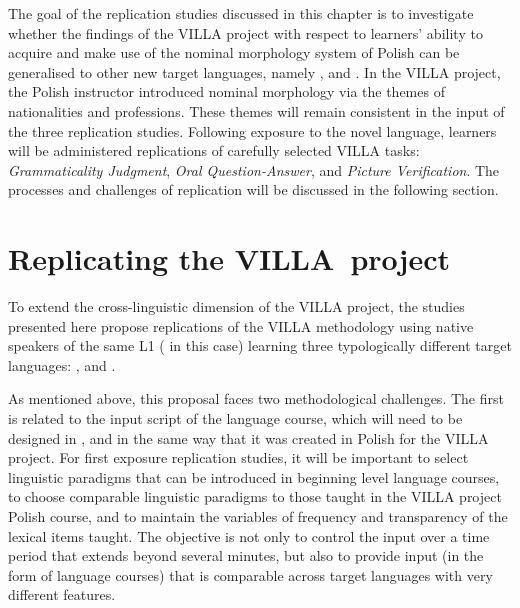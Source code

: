 \documentclass[output=paper,colorlinks,citecolor=brown,modfonts,nonflat]{../langscibook}
\begin{document}
The goal of the replication studies discussed in this chapter is to investigate whether the findings of the VILLA project with respect to learners’ ability to acquire and make use of the nominal morphology system of Polish can be generalised to other new target languages, namely ,  and . In the VILLA project, the Polish instructor introduced nominal morphology via the themes of nationalities and professions. These themes will remain consistent in the input of the three replication studies. Following exposure to the novel language, learners will be administered replications of carefully selected VILLA tasks: \textit{Grammaticality Judgment}, \textit{Oral Question-Answer}, and \textit{Picture Verification}. The processes and challenges of replication will be discussed in the following section.

\section{Replicating the VILLA~project}\label{sec:watorek:4}

To extend the cross-linguistic dimension of the VILLA project, the studies presented here propose replications of the VILLA methodology using native speakers of the same L1 ( in this case) learning three typologically different target languages: ,  and .

As mentioned above, this proposal faces two methodological challenges. The first is related to the input script of the language course, which will need to be designed in ,  and  in the same way that it was created in Polish for the VILLA project. For first exposure replication studies, it will be important to select linguistic paradigms that can be introduced in beginning level language courses, to choose comparable linguistic paradigms to those taught in the VILLA project Polish course, and to maintain the variables of frequency and transparency of the lexical items taught. The objective is not only to control the input over a time period that extends beyond several minutes, but also to provide input (in the form of language courses) that is comparable across target languages with very different features.
\end{document}

